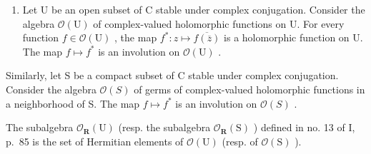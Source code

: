 \begin{enumerate}
\def\labelenumi{\arabic{enumi})}
\setcounter{enumi}{4}
\tightlist
\item
  Let U be an open subset of C stable under complex conjugation. Consider the algebra \(\mathcal{O}(\mathrm{U})\) of complex-valued holomorphic functions on U. For every function \(f \in \mathcal{O}(\mathrm{U})\) , the map \(f^{*}: z \mapsto \overline{f(\overline{z})}\) is a holomorphic function on U. The map \(f \mapsto f^{*}\) is an involution on \(\mathcal{O}(\mathrm{U})\) .
\end{enumerate}

Similarly, let S be a compact subset of C stable under complex conjugation. Consider the algebra \(\mathcal{O}(S)\) of germs of complex-valued holomorphic functions in a neighborhood of S. The map \(f \mapsto f^{*}\) is an involution on \(\mathcal{O}(S)\) .

The subalgebra \(\mathcal{O}_{\mathbf{R}}(\mathrm{U})\) (resp. the subalgebra \(\mathcal{O}_{\mathbf{R}}(\mathrm{S})\) ) defined in no. 13 of I, p.~85 is the set of Hermitian elements of \(\mathcal{O}(\mathrm{U})\) (resp. of \(\mathcal{O}(\mathrm{S})\) ).

